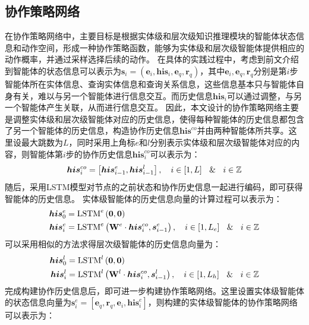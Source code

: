 \documentclass[algorithmlist, AutoFakeBold, AutoFakeSlant, figurelist, tablelist, nomlist, engineering]{seuthesix}
\begin{document}
\subsection{协作策略网络}
在协作策略网络中，主要目标是根据实体级和层次级知识推理模块的智能体状态信息和动作空间，形成一种协作策略函数，能够为实体级和层次级智能体提供相应的动作概率，并通过采样选择后续的动作。
在具体的实践过程中，考虑到前文介绍到智能体的状态信息可以表示为$\bm{s}_i = (\bm{e}_i, \bm{his}_i, \bm{e}_q, \bm{r}_q)$，其中$\bm{e}_i, \bm{e}_q, \bm{r}_q$分别是第$i$步智能体所在实体信息、查询实体信息和查询关系信息，这些信息基本只与智能体自身有关，难以与另一个智能体进行信息交互。而历史信息$\bm{his}_i$可以通过调整，与另一个智能体产生关联，从而进行信息交互。
因此，本文设计的协作策略网络主要是调整实体级和层次级智能体对应的历史信息，使得每种智能体的历史信息都包含了另一个智能体的历史信息，构造协作历史信息$\bm{his}^{co}$并由两种智能体所共享。这里设最大跳数为$L$，同时采用上角标$e$和$l$分别表示实体级和层次级智能体对应的内容，则智能体第$i$步的协作历史信息$\bm{his}_i^{co}$可以表示为：
\begin{equation}
  \bm{his}_{i}^{co} = \left[\bm{his}_{i-1}^e, \bm{his}_{i-1}^l\right], \quad i \in [1, L] \  \And \  i \in \mathbb{Z}
  \label{his_1}
\end{equation}
随后，采用LSTM模型对节点的之前状态和协作历史信息一起进行编码，即可获得智能体的历史信息。
实体级智能体的历史信息向量的计算过程可以表示为：
\begin{equation}
  \begin{aligned}
    \bm{his}_0^e &= \operatorname{LSTM}^e\left(\bm{0}, \bm{0}\right) \\
    \bm{his}_i^e &= \operatorname{LSTM}^e\left(\mathbf{W}^e \cdot \bm{his}_i^{co}, \bm{s}_{i-1}^e\right),\quad i \in [1, L_e] \  \And \  i \in \mathbb{Z}
  \end{aligned}
  \label{his_2}
\end{equation}
可以采用相似的方法求得层次级智能体的历史信息向量为：
\begin{equation}
  \begin{aligned}
    \bm{his}_0^l &=\operatorname{LSTM}^l\left(\bm{0}, \bm{0}\right) \\
    \bm{his}_i^l &= \operatorname{LSTM}^l\left(\mathbf{W}^l \cdot \bm{his}_i^{co}, \bm{s}_{i-1}^l\right),\quad i \in [1, L_h] \  \And \  i \in \mathbb{Z}
  \end{aligned}
  \label{his_3}
\end{equation}
完成构建协作历史信息后，即可进一步构建协作策略网络。这里设置实体级智能体的状态信息向量为$\bm{s}_i^{e} = \left[\bm{e}_q, \bm{r}_q, \bm{e}_i, \bm{his}_i^e\right]$，则构建的实体级智能体的协作策略网络可以表示为：
\end{document}

